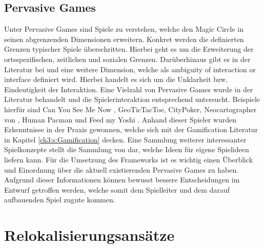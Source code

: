 \subsection*{Pervasive Games}

Unter Pervasive Games sind Spiele zu verstehen, welche den Magic Circle in seinen abgrenzenden Dimensionen erweitern.
Konkret werden die definierten Grenzen typischer Spiele überschritten.\cite{Montola.2005}
Hierbei geht es um die Erweiterung der ortsspezifischen, zeitlichen und sozialen Grenzen.\cite{Montola.2009}
Darüberhinaus gibt es in der Literatur bei \textcite{Nieuwdorp.2007} und \textcite{Bjork.2007} eine weitere Dimension, welche als \glqq ambiguity 
of interaction or interface\grqq{} definiert wird. Hierbei handelt es sich um die Unklarheit bzw. Eindeutigkeit der Interaktion.
Eine Vielzahl von Pervasive Games wurde in der Literatur behandelt und die Spielerinteraktion entsprechend untersucht.
Beispiele hierfür sind Can You See Me Now \cite{Flintham.2003}, GeoTicTacToe, CityPoker, Neocartographer von \textcite{Schlieder.2005}, Human Pacman \cite{Cheok.2003} und Feed my Yoshi \cite{Bell.2006}.
Anhand dieser Spieler wurden Erkenntnisse in der Praxis gewonnen, welche sich mit der Gamification Literatur in Kapitel \ref{ch3:s:Gamification} decken.
Eine Sammlung weiterer interessanter Spielkonzepte stellt die Sammlung von \textcite{Hinske.2007} dar, welche Ideen für eigene Spielideen liefern kann.
Für die Umsetzung des Frameworks ist es wichtig einen Überblick und Einordnung über die aktuell existierenden Pervasive Games zu haben. Aufgrund dieser Informationen können bewusst bessere Entscheidungen im Entwurf getroffen werden, welche somit dem Spielleiter und dem darauf aufbauenden Spiel zugute kommen.


\section{Relokalisierungsansätze}
\label{ch3:s:Relokalisierung}

